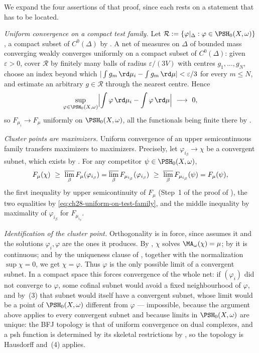 We expand the four assertions of that proof, since each rests on a statement
that has to be located.

\emph{Uniform convergence on a compact test family.}  Let
\(\mathcal R:=\{\varphi|_\Delta:\varphi\in\PSH_0(X,\omega)\}\), a compact
subset of \(C^0(\Delta)\) by .  A net of
measures on \(\Delta\) of bounded mass converging weakly converges uniformly
on a compact subset of \(C^0(\Delta)\): given \(\varepsilon>0\), cover
\(\mathcal R\) by finitely many balls of radius \(\varepsilon/(3V)\) with
centres \(g_1,\ldots,g_N\), choose an index beyond which
\(|\int g_m\,\rd\mu_i-\int g_m\,\rd\mu|<\varepsilon/3\) for every
\(m\leq N\), and estimate an arbitrary \(g\in\mathcal R\) through the
nearest centre.  Hence
\begin{equation}
\label{eq:ch28-uniform-on-test-family}
 \sup_{\varphi\in\PSH_0(X,\omega)}
 \Bigl|\int\varphi\,\rd\mu_i-\int\varphi\,\rd\mu\Bigr|
 \ \longrightarrow\ 0 ,
\end{equation}
so \(F_{\mu_i}\to F_\mu\) uniformly on \(\PSH_0(X,\omega)\), all the
functionals being finite there by .

\emph{Cluster points are maximizers.}  Uniform convergence of an upper
semicontinuous family transfers maximizers to maximizers.  Precisely, let
\(\varphi_{i_\beta}\to\chi\) be a convergent subnet, which exists by
.  For any competitor
\(\psi\in\PSH_0(X,\omega)\),
\[
 F_\mu(\chi)\ \geq\ \varlimsup_\beta F_{\mu}(\varphi_{i_\beta})
 =\varlimsup_\beta F_{\mu_{i_\beta}}(\varphi_{i_\beta})
 \ \geq\ \varlimsup_\beta F_{\mu_{i_\beta}}(\psi)=F_\mu(\psi),
\]
the first inequality by upper semicontinuity of \(F_\mu\)
(Step~1 of the proof of ), the two
equalities by \eqref{eq:ch28-uniform-on-test-family}, and the middle
inequality by maximality of \(\varphi_{i_\beta}\) for \(F_{\mu_{i_\beta}}\).

\emph{Identification of the cluster point.}  Orthogonality is in force,
since  assumes it and the solutions
\(\varphi_i,\varphi\) are the ones it produces.  By
, \(\chi\) solves
\(\MA_\omega(\chi)=\mu\); by  it is
continuous; and by the uniqueness clause of
, together with the normalization
\(\sup\chi=0\), we get \(\chi=\varphi\).  Thus \(\varphi\) is the only
possible limit of a convergent subnet.  In a compact space this forces
convergence of the whole net: if \((\varphi_i)\) did not converge to
\(\varphi\), some cofinal subnet would avoid a fixed neighbourhood of
\(\varphi\), and by \,(3) that subnet would itself
have a convergent subnet, whose limit would be a point of
\(\PSH_0(X,\omega)\) different from \(\varphi\) --- impossible, because the
argument above applies to every convergent subnet and because limits in
\(\PSH_0(X,\omega)\) are unique: the BFJ topology is that of uniform
convergence on dual complexes, and a psh function is determined by its
skeletal restrictions by , so the
topology is Hausdorff and \,(4) applies.

